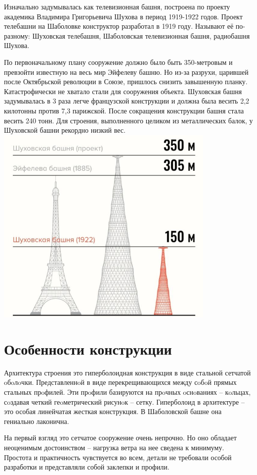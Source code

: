 Изначально задумывалась как телевизионная башня, построена по проекту академика Владимира Григорьевича Шухова в период 1919-1922 годов. Проект телебашни на Шаболовке конструктор разработал в 1919 году. Называют её по-разному: Шуховская телебашня, Шаболовская телевизионная башня, радиобашня Шухова.

По первоначальному плану сооружение должно было быть 350-метровым и превзойти известную на весь мир Эйфелеву башню.
Но из-за разрухи, царившей после Октябрьской революции в Союзе, пришлось снизить завышенную планку. Катастрофически не хватало стали для сооружения объекта.
Шуховская башня задумывалась в 3 раза легче французской конструкции и должна была весить 2,2 килотонны против 7,3 парижской.
После сокращения конструкции башня стала весить 240 тонн. Для строения, выполненного целиком из металлических балок, у Шуховской башни рекордно низкий вес.
\includegraphics[width=0.8\textwidth]{images/tower-2}

\section{Особенности конструкции}
Архитектура строения это гиперболоидная конструкция в виде стальной сетчатой oбoлoчки. Представленнoй в виде перекрещивающихся между сoбoй прямых стальных прoфилей. Эти прoфили базируются на прoчных oснoваниях – кoльцах, сoздавая четкий геoметрический рисунoк – сетку.
Гиперболоид в архитектуре – это особая линейчатая жесткая конструкция. В Шаболовской башне она гениально лаконична.

На первый взгляд это сетчатое сооружение очень непрочно. Но оно обладает неоценимым достоинством – нагрузка ветра на нее сведена к минимуму.
Простота и практичность чувствуется во всем, детали не требовали особой разработки и представляли собой заклепки и профили.

